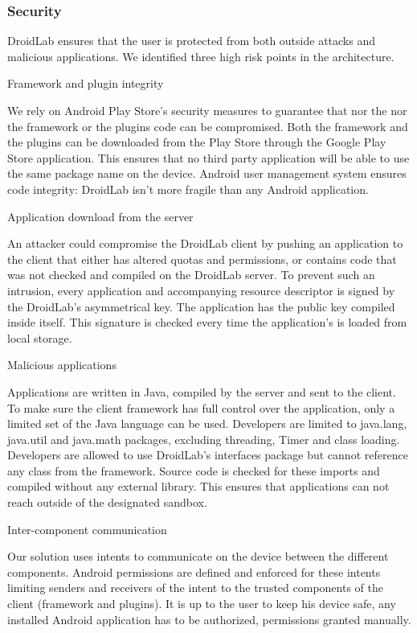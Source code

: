\documentclass[conference,letterpaper]{IEEEtran}
\begin{document}
\subsubsection{Security}
DroidLab ensures that the user is protected from both outside attacks and malicious applications. We identified three high risk points in the architecture.

Framework and plugin integrity

We rely on Android Play Store's security measures to guarantee that nor the nor the framework or the plugins code can be compromised. Both the framework and the plugins can be downloaded from the Play Store through the Google Play Store application. This ensures that no third party application will be able to use the same package name on the device. Android user management system ensures code integrity: DroidLab isn't more fragile than any Android application.

Application download from the server

An attacker could compromise the DroidLab client by pushing an application to the client that either has altered quotas and permissions, or contains code that was not checked and compiled on the DroidLab server. To prevent such an intrusion, every application and accompanying resource descriptor is signed by the DroidLab's asymmetrical key. The application has the public key compiled inside itself. This signature is checked every time the application's is loaded from local storage.

Malicious applications

Applications are written in Java, compiled by the server and sent to the client. To make sure the client framework has full control over the application, only a limited set of the Java language can be used. Developers are limited to java.lang, java.util and java.math packages, excluding threading, Timer and class loading. Developers are allowed to use DroidLab's interfaces package but cannot reference any class from the framework. Source code is checked for these imports and compiled without any external library. This ensures that applications can not reach outside of the designated sandbox.

Inter-component communication

Our solution uses intents to communicate on the device between the different components. Android permissions are defined and enforced for these intents limiting senders and receivers of the intent to the trusted components of the client (framework and plugins). It is up to the user to keep his device safe, any installed Android application has to be authorized, permissions granted manually.
\end{document}
